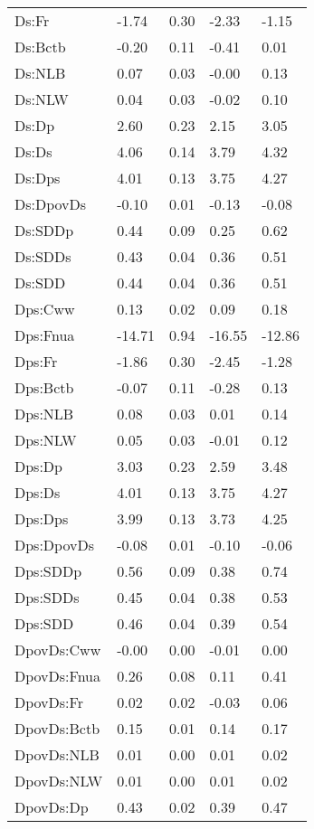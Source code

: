 \begin{center}
\begin{longtable}{|p{0.9in}|p{0.7in}|p{0.7in}|p{0.7in}|p{0.7in}|}
   Ds:Fr & -1.74 & 0.30 & -2.33 & -1.15 \\ 
   Ds:Bctb & -0.20 & 0.11 & -0.41 & 0.01 \\ 
   Ds:NLB & 0.07 & 0.03 & -0.00 & 0.13 \\ 
   Ds:NLW & 0.04 & 0.03 & -0.02 & 0.10 \\ 
   Ds:Dp & 2.60 & 0.23 & 2.15 & 3.05 \\ 
   Ds:Ds & 4.06 & 0.14 & 3.79 & 4.32 \\ 
   Ds:Dps & 4.01 & 0.13 & 3.75 & 4.27 \\ 
   Ds:DpovDs & -0.10 & 0.01 & -0.13 & -0.08 \\ 
   Ds:SDDp & 0.44 & 0.09 & 0.25 & 0.62 \\ 
   Ds:SDDs & 0.43 & 0.04 & 0.36 & 0.51 \\ 
   Ds:SDD & 0.44 & 0.04 & 0.36 & 0.51 \\ 
   Dps:Cww & 0.13 & 0.02 & 0.09 & 0.18 \\ 
   Dps:Fnua & -14.71 & 0.94 & -16.55 & -12.86 \\ 
   Dps:Fr & -1.86 & 0.30 & -2.45 & -1.28 \\ 
   Dps:Bctb & -0.07 & 0.11 & -0.28 & 0.13 \\ 
   Dps:NLB & 0.08 & 0.03 & 0.01 & 0.14 \\ 
   Dps:NLW & 0.05 & 0.03 & -0.01 & 0.12 \\ 
   Dps:Dp & 3.03 & 0.23 & 2.59 & 3.48 \\ 
   Dps:Ds & 4.01 & 0.13 & 3.75 & 4.27 \\ 
   Dps:Dps & 3.99 & 0.13 & 3.73 & 4.25 \\ 
   Dps:DpovDs & -0.08 & 0.01 & -0.10 & -0.06 \\ 
   Dps:SDDp & 0.56 & 0.09 & 0.38 & 0.74 \\ 
   Dps:SDDs & 0.45 & 0.04 & 0.38 & 0.53 \\ 
   Dps:SDD & 0.46 & 0.04 & 0.39 & 0.54 \\ 
   DpovDs:Cww & -0.00 & 0.00 & -0.01 & 0.00 \\ 
   DpovDs:Fnua & 0.26 & 0.08 & 0.11 & 0.41 \\ 
   DpovDs:Fr & 0.02 & 0.02 & -0.03 & 0.06 \\ 
   DpovDs:Bctb & 0.15 & 0.01 & 0.14 & 0.17 \\ 
   DpovDs:NLB & 0.01 & 0.00 & 0.01 & 0.02 \\ 
   DpovDs:NLW & 0.01 & 0.00 & 0.01 & 0.02 \\ 
   DpovDs:Dp & 0.43 & 0.02 & 0.39 & 0.47 \\ 

\end{longtable}
\end{center}
